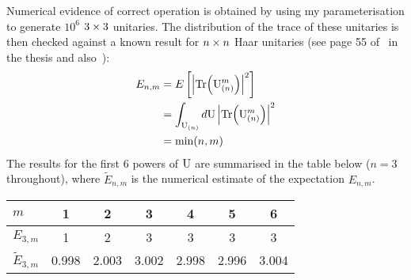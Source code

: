 Numerical evidence of correct operation is obtained by using my parameterisation
to generate \(10^{6}\) \(3 \times 3\) unitaries. The distribution of the trace of
these unitaries is then checked against a known result for \(n \times n\) Haar
unitaries (see page 55 of~\cite{reffy} in the thesis and also~\cite{diaconis}):
\begin{align}
    E_{n,m}
    &= E \left[ \left| \mathrm{Tr} \!\left( \mathrm{U}_{ \left(n\right) }^{m} \right) \right|^{2} \right] \\
    &= \int_{\mathrm{U}_{ \left(n\right) }} d \mathrm{U} \left| \mathrm{Tr} \!\left( \mathrm{U}_{
    \left(n\right) }^{m} \right) \right|^{2} \\
    &= \min \!\left(n,m\right)
\end{align}
The results for the first 6 powers of \( \mathrm{U} \) are summarised in the table
below (\(n=3\) throughout), where \(\widetilde{E}_{n,m}\) is the numerical
estimate of the expectation \(E_{n,m}\).

\def\arraystretch{1.3}
\begin{tabular}{l|c|c|c|c|c|c}
  \(m\) & 1 & 2 & 3 & 4 & 5 & 6 \\
  \hline
  \(E_{3,m}\) & 1 & 2 & 3 & 3 & 3 & 3 \\
  \hline
  \(\widetilde{E}_{3,m}\) & 0.998 & 2.003 & 3.002 & 2.998 & 2.996 & 3.004
\end{tabular}
